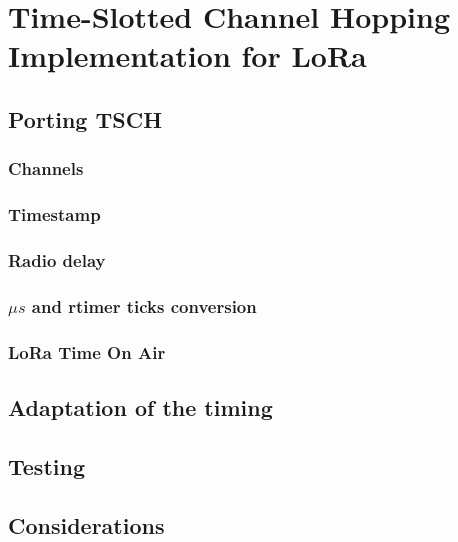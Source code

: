 \chapter{Time-Slotted Channel Hopping Implementation for LoRa}

\section{Porting TSCH}

\subsection{Channels}

\subsection{Timestamp}

\subsection{Radio delay}

\subsection{$\mu s$ and rtimer ticks conversion}

\subsection{LoRa Time On Air}

\section{Adaptation of the timing}

\section{Testing}

\section{Considerations}
